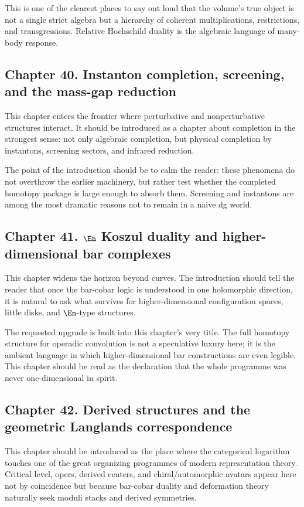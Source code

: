 This is one of the clearest places to say out loud that the volume's true object is not a single strict algebra but a hierarchy of coherent multiplications, restrictions, and transgressions.  Relative Hochschild duality is the algebraic language of many-body response.

\subsection*{Chapter 40. Instanton completion, screening, and the mass-gap reduction}
This chapter enters the frontier where perturbative and nonperturbative structures interact.  It should be introduced as a chapter about completion in the strongest sense: not only algebraic completion, but physical completion by instantons, screening sectors, and infrared reduction.

The point of the introduction should be to calm the reader: these phenomena do not overthrow the earlier machinery, but rather test whether the completed homotopy package is large enough to absorb them.  Screening and instantons are among the most dramatic reasons not to remain in a naive dg world.

\subsection*{Chapter 41. $\En$ Koszul duality and higher-dimensional bar complexes}
This chapter widens the horizon beyond curves.  The introduction should tell the reader that once the bar-cobar logic is understood in one holomorphic direction, it is natural to ask what survives for higher-dimensional configuration spaces, little disks, and $\En$-type structures.

The requested upgrade is built into this chapter's very title.  The full homotopy structure for operadic convolution is not a speculative luxury here; it is the ambient language in which higher-dimensional bar constructions are even legible.  This chapter should be read as the declaration that the whole programme was never one-dimensional in spirit.

\subsection*{Chapter 42. Derived structures and the geometric Langlands correspondence}
This chapter should be introduced as the place where the categorical logarithm touches one of the great organizing programmes of modern representation theory.  Critical level, opers, derived centers, and chiral/automorphic avatars appear here not by coincidence but because bar-cobar duality and deformation theory naturally seek moduli stacks and derived symmetries.


